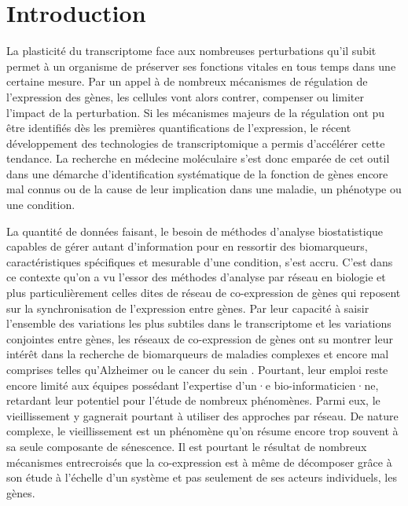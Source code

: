 \setcounter{chapter}{1}         %
\setcounter{section}{0}
\chapter*{Introduction}         %
\label{chapter:intro}

La plasticité du transcriptome face aux nombreuses perturbations qu'il subit permet à un organisme de préserver ses fonctions vitales en tous temps dans une certaine mesure. Par un appel à de nombreux mécanismes de régulation de l'expression des gènes, les cellules vont alors contrer, compenser ou limiter l'impact de la perturbation. Si les mécanismes majeurs de la régulation ont pu être identifiés dès les premières quantifications de l'expression, le récent développement des technologies de transcriptomique a permis d'accélérer cette tendance. La recherche en médecine moléculaire s'est donc emparée de cet outil dans une démarche d'identification systématique de la fonction de gènes encore mal connus ou de la cause de leur implication dans une maladie, un phénotype ou une condition.

La quantité de données faisant, le besoin de méthodes d'analyse biostatistique capables de gérer autant d'information pour en ressortir des biomarqueurs, caractéristiques spécifiques et mesurable d'une condition, s'est accru. C'est dans ce contexte qu'on a vu l’essor des méthodes d'analyse par réseau en biologie \cite{Barabasi2004} et plus particulièrement celles dites de réseau de co-expression de gènes qui reposent sur la synchronisation de l'expression entre gènes. Par leur capacité à saisir l'ensemble des variations les plus subtiles dans le transcriptome et les variations conjointes entre gènes, les réseaux de co-expression de gènes ont su montrer leur intérêt dans la recherche de biomarqueurs de maladies complexes et encore mal comprises telles qu'Alzheimer \cite{Hu2020Nov} ou le cancer du sein \cite{Garcia-Cortes2020Jul}. Pourtant, leur emploi reste encore limité aux équipes possédant l'expertise d'un·e bio-informaticien·ne, retardant leur potentiel pour l'étude de nombreux phénomènes. Parmi eux, le vieillissement y gagnerait pourtant à utiliser des approches par réseau. De nature complexe, le vieillissement est un phénomène qu'on résume encore trop souvent à sa seule composante de sénescence. Il est pourtant le résultat de nombreux mécanismes entrecroisés que la co-expression est à même de décomposer grâce à son étude à l'échelle d'un système et pas seulement de ses acteurs individuels, les gènes.

